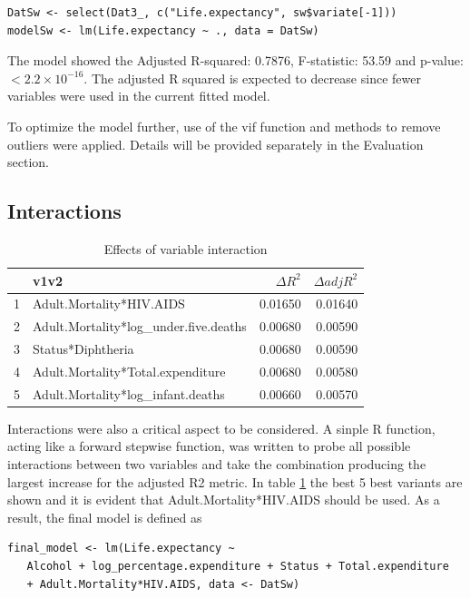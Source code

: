 \begin{verbatim}
DatSw <- select(Dat3_, c("Life.expectancy", sw$variate[-1]))
modelSw <- lm(Life.expectancy ~ ., data = DatSw)
\end{verbatim}

The model showed the Adjusted R-squared:  0.7876, F-statistic: 53.59 and p-value: $< 2.2\times 10^{-16}$. The adjusted R squared is expected to decrease since fewer variables were used in the current fitted model.

To optimize the model further, use of the vif function and methods to remove outliers were applied. Details will be provided separately in the Evaluation section. 

\subsection{Interactions}

\begin{table}[ht]
\centering
\begin{tabular}{rlrr}
  \hline
 & v1v2 & $\Delta R^2$ & $\Delta adjR^2$ \\ 
  \hline
1 & Adult.Mortality*HIV.AIDS & 0.01650 & 0.01640 \\ 
  2 & Adult.Mortality*log\_under.five.deaths & 0.00680 & 0.00590 \\ 
  3 & Status*Diphtheria & 0.00680 & 0.00590 \\ 
  4 & Adult.Mortality*Total.expenditure & 0.00680 & 0.00580 \\ 
  5 & Adult.Mortality*log\_infant.deaths & 0.00660 & 0.00570 \\ 
   \hline
\end{tabular}
\caption{Effects of variable interaction} 
\label{tab:int}
\end{table}

Interactions were also a critical aspect to be considered. A sinple R function, acting like a forward stepwise function, was written to probe all possible interactions between two variables and take the combination producing the largest increase for the adjusted R2 metric. In table \ref{tab:int} the best 5 best variants are shown and it is evident that  Adult.Mortality*HIV.AIDS should be used. As a result, the final model is defined as
\begin{verbatim}
final_model <- lm(Life.expectancy ~ 
   Alcohol + log_percentage.expenditure + Status + Total.expenditure 
   + Adult.Mortality*HIV.AIDS, data <- DatSw)
\end{verbatim}

